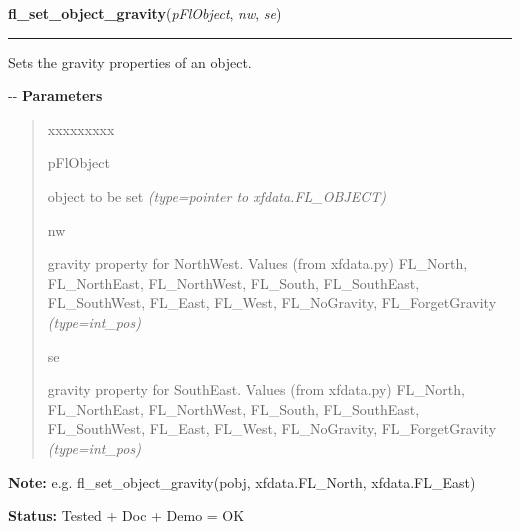 \hspace{.8\funcindent}\begin{boxedminipage}{\funcwidth}

    \raggedright \textbf{fl\_set\_object\_gravity}(\textit{pFlObject}, \textit{nw}, \textit{se})

    \vspace{-1.5ex}

    \rule{\textwidth}{0.5\fboxrule}
\setlength{\parskip}{2ex}

Sets the gravity properties of an object.

-{}-
\setlength{\parskip}{1ex}
      \textbf{Parameters}
      \vspace{-1ex}

      \begin{quote}
        \begin{Ventry}{xxxxxxxxx}

          \item[pFlObject]


object to be set
            {\it (type=pointer to xfdata.FL\_OBJECT)}

          \item[nw]


gravity property for NorthWest. Values (from xfdata.py)
FL\_North, FL\_NorthEast, FL\_NorthWest, FL\_South, FL\_SouthEast,
FL\_SouthWest, FL\_East, FL\_West, FL\_NoGravity, FL\_ForgetGravity
            {\it (type=int\_pos)}

          \item[se]


gravity property for SouthEast. Values (from xfdata.py)
FL\_North, FL\_NorthEast, FL\_NorthWest, FL\_South, FL\_SouthEast,
FL\_SouthWest, FL\_East, FL\_West, FL\_NoGravity, FL\_ForgetGravity
            {\it (type=int\_pos)}

        \end{Ventry}

      \end{quote}

\textbf{Note:} 
e.g. fl\_set\_object\_gravity(pobj, xfdata.FL\_North, xfdata.FL\_East)


\textbf{Status:} 
Tested + Doc + Demo = OK


    \end{boxedminipage}

    \label{xformslib:flbasic:fl_get_object_gravity}

